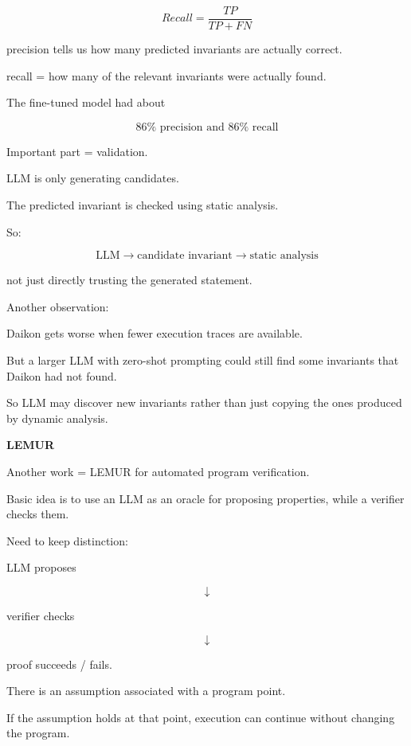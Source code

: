 \documentclass[11pt]{article}
\begin{document}
\[
Recall = \frac{TP}{TP+FN}
\]

precision tells us how many predicted invariants
are actually correct.

recall = how many of the relevant invariants were
actually found.

The fine-tuned model had about

\[
86\% \text{ precision and } 86\% \text{ recall}
\]

\vspace{7pt}

Important part = validation.

LLM is only generating candidates.

The predicted invariant is checked using
static analysis.

So:

\[
\text{LLM}
\rightarrow
\text{candidate invariant}
\rightarrow
\text{static analysis}
\]

not just directly trusting the generated statement.

\vspace{7pt}

Another observation:

Daikon gets worse when fewer execution traces
are available.

But a larger LLM with zero-shot prompting could
still find some invariants that Daikon had not found.

So LLM may discover new invariants rather than
just copying the ones produced by dynamic analysis.

\vspace{9pt}

\textbf{LEMUR}

Another work = LEMUR for automated program verification.

Basic idea is to use an LLM as an oracle for proposing
properties, while a verifier checks them.

Need to keep distinction:

LLM proposes

\[
\downarrow
\]

verifier checks

\[
\downarrow
\]

proof succeeds / fails.

\vspace{7pt}

There is an assumption associated with a program point.

If the assumption holds at that point, execution can
continue without changing the program.
\end{document}
